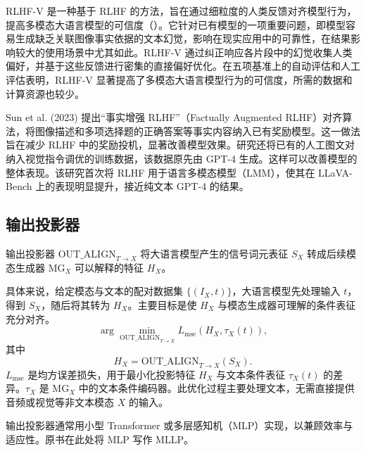 RLHF-V 是一种基于 RLHF 的方法，旨在通过细粒度的人类反馈对齐模型行为，提高多模态大语言模型的可信度（）。它针对已有模型的一项重要问题，即模型容易生成缺乏关联图像事实依据的文本幻觉，影响在现实应用中的可靠性，在结果影响较大的使用场景中尤其如此。RLHF-V 通过纠正响应各片段中的幻觉收集人类偏好，并基于这些反馈进行密集的直接偏好优化。在五项基准上的自动评估和人工评估表明，RLHF-V 显著提高了多模态大语言模型行为的可信度，所需的数据和计算资源也较少。

\begin{practicaltip}
Sun et al. (2023) 提出“事实增强 RLHF”（Factually Augmented RLHF）对齐算法，将图像描述和多项选择题的正确答案等事实内容纳入已有奖励模型。这一做法旨在减少 RLHF 中的奖励投机，显著改善模型效果。研究还将已有的人工图文对纳入视觉指令调优的训练数据，该数据原先由 GPT-4 生成。这样可以改善模型的整体表现。该研究首次将 RLHF 用于语言多模态模型（LMM），使其在 LLaVA-Bench 上的表现明显提升，接近纯文本 GPT-4 的结果。
\end{practicaltip}

\subsection{输出投影器}
\label{sec:ch09-output-projector}
\begin{keypoint}
输出投影器 $\mathrm{OUT\_ALIGN}_{T\to X}$ 将大语言模型产生的信号词元表征 $S_X$ 转成后续模态生成器 $\mathrm{MG}_X$ 可以解释的特征 $H_X$。
\end{keypoint}

具体来说，给定模态与文本的配对数据集 $\{(I_X,t)\}$，大语言模型先处理输入 $t$，得到 $S_X$，随后将其转为 $H_X$。主要目标是使 $H_X$ 与模态生成器可理解的条件表征充分对齐。
\begin{equation}
\arg\min_{\mathrm{OUT\_ALIGN}_{T\to X}}L_{\mathrm{mse}}(H_X,\tau_X(t)),
\label{eq:ch09-output-projector-loss}
\end{equation}
其中
\begin{equation}
H_X=\mathrm{OUT\_ALIGN}_{T\to X}(S_X).
\label{eq:ch09-output-projector}
\end{equation}
$L_{\mathrm{mse}}$ 是均方误差损失，用于最小化投影特征 $H_X$ 与文本条件表征 $\tau_X(t)$ 的差异。$\tau_X$ 是 $\mathrm{MG}_X$ 中的文本条件编码器。此优化过程主要处理文本，无需直接提供音频或视觉等非文本模态 $X$ 的输入。

\begin{practicaltip}
输出投影器通常用小型 Transformer 或多层感知机（MLP）实现，以兼顾效率与适应性。原书在此处将 MLP 写作 MLLP。
\end{practicaltip}

